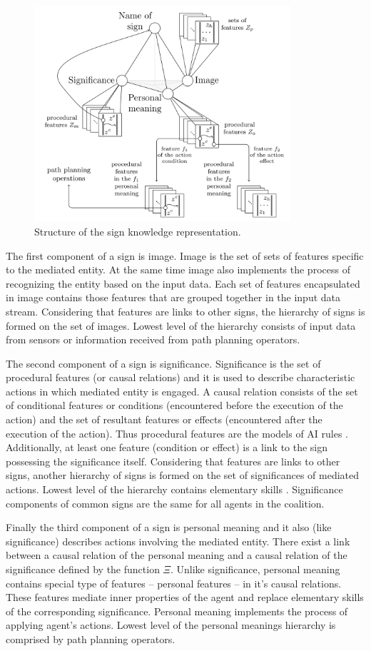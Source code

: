 \documentclass[runningheads,a4paper]{llncs}
\begin{document}
\begin{figure}
	\centering
	\includegraphics[height=8cm]{sign_kr}
	\caption{Structure of the sign knowledge representation.}
	\label{fig:sign}
\end{figure}

The first component of a sign is image. Image is the set of sets of features specific to the mediated entity. At the same time image also implements the process of recognizing the entity based on the input data. Each set of features encapsulated in image contains those features that are grouped together in the input data stream. Considering that features are links to other signs, the hierarchy of signs is formed on the set of images. Lowest level of the hierarchy consists of input data from sensors or information received from path planning operators.

The second component of a sign is significance. Significance is the set of procedural features (or causal relations) and it is used to describe characteristic actions in which mediated entity is engaged. A causal relation consists of the set of conditional features or conditions (encountered before the execution of the action) and the set of resultant features or effects (encountered after the execution of the action). Thus procedural features are the models of AI rules \cite{Nilsson1998}. Additionally, at least one feature (condition or effect) is a link to the sign possessing the significance itself. Considering that features are links to other signs, another hierarchy of signs is formed on the set of significances of mediated actions. Lowest level of the hierarchy contains elementary skills . Significance components of common signs are the same for all agents in the coalition.

Finally the third component of a sign is personal meaning and it also (like significance) describes actions involving the mediated entity. There exist a link between a causal relation of the personal meaning and a causal relation of the significance defined by the function $\Xi$. Unlike significance, personal meaning contains special type of features – personal features – in it's causal relations. These features mediate inner properties of the agent and replace elementary skills of the corresponding significance. Personal meaning implements the process of applying agent's actions. Lowest level of the personal meanings hierarchy is comprised by path planning operators. 
\end{document}

